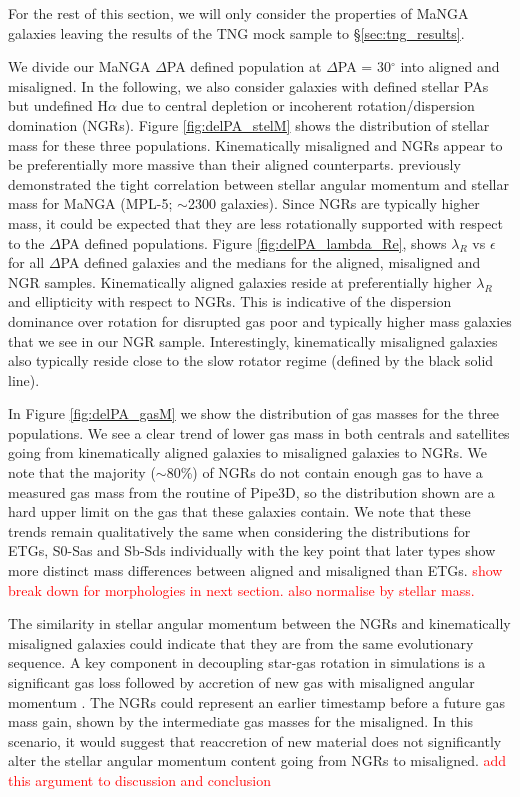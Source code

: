 \documentclass[fleqn,usenatbib]{mnras}
\newcommand{\red}[1]{{\textcolor{red}{#1}}}
\begin{document}
For the rest of this section, we will only consider the properties of MaNGA galaxies leaving the results of the TNG mock sample to \S\ref{sec:tng_results}.

We divide our MaNGA $\Delta$PA defined population at $\Delta$PA = 30$^{\circ}$ into aligned and misaligned. In the following, we also consider galaxies with defined stellar PAs but undefined H$\alpha$ due to central depletion or incoherent rotation/dispersion domination (NGRs). Figure \ref{fig:delPA_stelM} shows the distribution of stellar mass for these three populations. Kinematically misaligned and NGRs appear to be preferentially more massive than their aligned counterparts. \citet{graham2018} previously demonstrated the tight correlation between stellar angular momentum and stellar mass for MaNGA (MPL-5; $\sim$2300 galaxies). Since NGRs are typically higher mass, it could be expected that they are less rotationally supported with respect to the $\Delta$PA defined populations. Figure \ref{fig:delPA_lambda_Re}, shows $\lambda_R$ vs $\epsilon$ for all $\Delta$PA defined galaxies and the medians for the aligned, misaligned and NGR samples. Kinematically aligned galaxies reside at preferentially higher $\lambda_R$ and ellipticity with respect to NGRs. This is indicative of the dispersion dominance over rotation for disrupted gas poor and typically higher mass galaxies that we see in our NGR sample. Interestingly, kinematically misaligned galaxies also typically reside close to the slow rotator regime (defined by the black solid line). 

In Figure \ref{fig:delPA_gasM} we show the distribution of gas masses for the three populations. We see a clear trend of lower gas mass in both centrals and satellites going from kinematically aligned galaxies to misaligned galaxies to NGRs. We note that the majority ($\sim$80\%) of NGRs do not contain enough gas to have a measured gas mass from the routine of Pipe3D, so the distribution shown are a hard upper limit on the gas that these galaxies contain. We note that these trends remain qualitatively the same when considering the distributions for ETGs, S0-Sas and Sb-Sds individually with the key point that later types show more distinct mass differences between aligned and misaligned than ETGs. \red{show break down for morphologies in next section. also normalise by stellar mass.}

The similarity in stellar angular momentum between the NGRs and kinematically misaligned galaxies could indicate that they are from the same evolutionary sequence. A key component in decoupling star-gas rotation in simulations is a significant gas loss followed by accretion of new gas with misaligned angular momentum \citep[][]{vdvoort2015, starkenburg+19}. The NGRs could represent an earlier timestamp before a future gas mass gain, shown by the intermediate gas masses for the misaligned. In this scenario, it would suggest that reaccretion of new material does not significantly alter the stellar angular momentum content going from NGRs to misaligned. \red{add this argument to discussion and conclusion}
\end{document}

